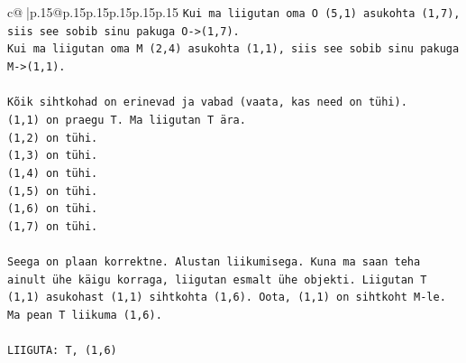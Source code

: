 \documentclass{article}
\begin{document}
{\begin{supertabular}{c@{$\;$}|p{.15\linewidth}@{}p{.15\linewidth}p{.15\linewidth}p{.15\linewidth}p{.15\linewidth}p{.15\linewidth}}
{{{\texttt{Kui ma liigutan oma O (5,1) asukohta (1,7), siis see sobib sinu pakuga O{-}>(1,7).} \\
\texttt{Kui ma liigutan oma M (2,4) asukohta (1,1), siis see sobib sinu pakuga M{-}>(1,1).} \\
\\ 
\texttt{Kõik sihtkohad on erinevad ja vabad (vaata, kas need on tühi).} \\
\texttt{(1,1) on praegu T. Ma liigutan T ära.} \\
\texttt{(1,2) on tühi.} \\
\texttt{(1,3) on tühi.} \\
\texttt{(1,4) on tühi.} \\
\texttt{(1,5) on tühi.} \\
\texttt{(1,6) on tühi.} \\
\texttt{(1,7) on tühi.} \\
\\ 
\texttt{Seega on plaan korrektne. Alustan liikumisega. Kuna ma saan teha ainult ühe käigu korraga, liigutan esmalt ühe objekti. Liigutan T (1,1) asukohast (1,1) sihtkohta (1,6). Oota, (1,1) on sihtkoht M{-}le. Ma pean T liikuma (1,6).} \\
\\ 
\texttt{LIIGUTA: T, (1,6)} \\
            }
        }
    }
     \\ \\


\end{supertabular}}
\end{document}
